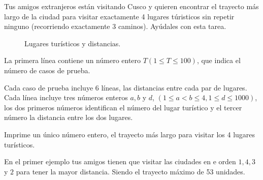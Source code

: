 
Tus amigos extranjeros están visitando Cusco y quieren encontrar el trayecto más largo de la ciudad para visitar exactamente 4 lugares túristicos sin repetir ninguno (recorriendo exactamente 3 caminos). Ayúdales con esta tarea.


\begin{figure}[h]
    \centering
    
    \caption{Lugares turísticos y distancias.}
\end{figure}



La primera línea contiene un número entero $T (1 \leq T \leq 100)$,  que indica el número de casos de prueba.

Cada caso de prueba incluye 6 líneas, las distancias entre cada par de lugares. Cada línea incluye tres números enteros $a, b$ y $d$, $(1 \leq a < b \leq 4, 1 \leq d \leq 1000)$, los dos primeros números identifican el número del lugar turístico y el tercer número la distancia entre los dos lugares.

\outputText

Imprime un único número entero, el trayecto más largo para visitar los 4 lugares turísticos.

\exampleCases

\begin{example}
\end{example}

\explanationText

En el primer ejemplo tus amigos tienen que visitar las ciudades en e orden $1, 4, 3$ y $2$ para tener la mayor distancia. Siendo el trayecto máximo de 53 unidades.
